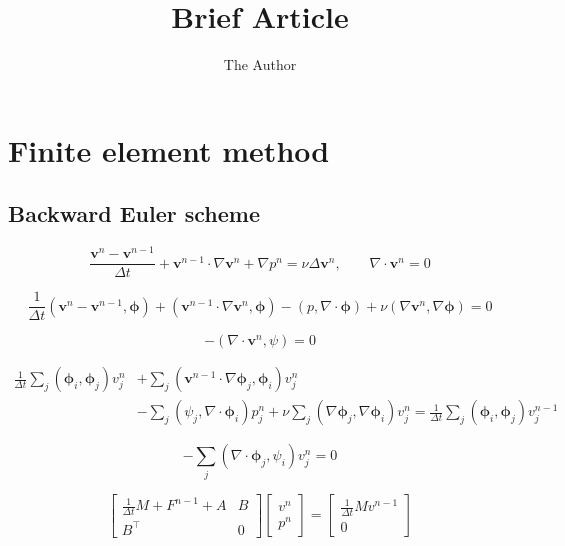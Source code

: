 \documentclass[12pt, oneside]{article}   	%
\title{Brief Article}
\author{The Author}
\newcommand{\vel}{\bm{v}}
\newcommand{\dt}{\Delta t}
\newcommand{\idt}{\frac{1}{\dt}}
\newcommand{\vtest}{\bm{\phi}}
\newcommand{\ptest}{\psi}
\newcommand{\ip}[1]{\left( #1 \right)}
\begin{document}
\maketitle
\section{Finite element method}
\subsection{Backward Euler scheme}
\[
\frac{\vel^n - \vel^{n-1}}{\dt} + \vel^{n-1} \cdot \nabla \vel^{n} + \nabla p^n = \nu \Delta \vel^n, \qquad \nabla \cdot \vel^n = 0
\]

\[
\idt \ip{\vel^n - \vel^{n-1}, \vtest} + \ip{\vel^{n-1} \cdot \nabla \vel^{n}, \vtest} - \ip{p, \nabla\cdot\vtest} + \nu \ip{\nabla\vel^n, \nabla\vtest} = 0
\]

\[
- \ip{\nabla \cdot \vel^n, \ptest} = 0
\]

\[
\begin{aligned}
\idt \sum_j \ip{\vtest_i, \vtest_j} v_j^n & + \sum_j \ip{\vel^{n-1} \cdot \nabla \vtest_j, \vtest_i} v_j^n \\
& - \sum_j \ip{\psi_j, \nabla\cdot\vtest_i} p_j^n + \nu \sum_j \ip{\nabla\vtest_j, \nabla\vtest_i} v_j^n = \idt \sum_j \ip{\vtest_i, \vtest_j} v_j^{n-1}
\end{aligned}
\]

\[
- \sum_j \ip{\nabla \cdot \vtest_j, \ptest_i} v_j^n = 0
\]

\[
\begin{bmatrix}
\idt M + F^{n-1} + A & B \\
B^\top & 0 \end{bmatrix}
\begin{bmatrix}
v^n \\ p^n \end{bmatrix} = \begin{bmatrix}
\idt M v^{n-1} \\ 0 \end{bmatrix}
\]
\end{document}
